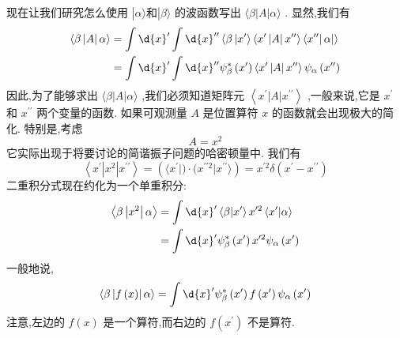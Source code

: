 \documentclass[lang=cn,newtx,10pt,scheme=chinese,thmcnt=section]{elegantbook}
\begin{document}
现在让我们研究怎么使用 $| {\alpha \rangle \text{和}}| \beta \rangle$ 的波函数写出 $\langle \beta \left| A\right| \alpha \rangle$ . 显然,我们有
\begin{equation}
	\begin{aligned}
		\langle \beta \left| A\right| \alpha \rangle &= \int \d{x}^{\prime }\int \d{x}^{\prime \prime }\left\langle {\beta \left| {{x}^{\prime }\rangle \left\langle {{x}^{\prime }\left| A\right| {x}^{\prime \prime }}\right\rangle \left\langle {x}^{\prime \prime }\right| \alpha }\right| }\right\rangle\\
		&= \int \d{x}^{\prime }\int \d{x}^{\prime \prime }{\psi }_{\beta }^{ * }\left( {x}^{\prime }\right) \left\langle {{x}^{\prime }\left| A\right| {x}^{\prime \prime }}\right\rangle {\psi }_{\alpha }\left( {x}^{\prime \prime }\right)
	\end{aligned}
\end{equation}
因此,为了能够求出 $\langle \beta \left| A\right| \alpha \rangle$ ,我们必须知道矩阵元 $\left\langle {{x}^{\prime }\left| A\right| {x}^{\prime \prime }}\right\rangle$ ,一般来说,它是 ${x}^{\prime }$ 和 ${x}^{\prime \prime }$ 两个变量的函数.
如果可观测量 $A$ 是位置算符 $x$ 的函数就会出现极大的简化. 特别是,考虑
\begin{equation}
	A = {x}^{2}
\end{equation}
它实际出现于将要讨论的简谐振子问题的哈密顿量中. 我们有
\begin{equation}
	\left\langle {{x}^{\prime }\left| {x}^{2}\right| {x}^{\prime \prime }}\right\rangle = ( {\langle {{x}^{\prime } | }) \cdot ( {{x}^{\prime \prime 2} | {x}^{\prime \prime }}\rangle }) = {x}^{\prime 2}\delta ( {x}^{\prime } - {x}^{\prime \prime })
\end{equation}
二重积分式现在约化为一个单重积分:
\begin{equation}
	\begin{aligned}
		\left\langle {\beta \left| {x}^{2}\right| \alpha }\right\rangle &= \int \d{x}^{\prime }\left\langle {\beta | {x}^{\prime }}\right\rangle {x}^{\prime 2}\left\langle {{x}^{\prime } | \alpha }\right\rangle\\
		&= \int \d{x}^{\prime }{\psi }_{\beta }^{ * }\left( {x}^{\prime }\right) {x}^{\prime 2}{\psi }_{\alpha }\left( {x}^{\prime }\right)
	\end{aligned}
\end{equation}
一般地说,
\begin{equation}
	\langle \beta \left| {f\left( x\right) }\right| \alpha \rangle = \int \d{x}^{\prime }{\psi }_{\beta }^{ * }\left( {x}^{\prime }\right) f\left( {x}^{\prime }\right) {\psi }_{\alpha }\left( {x}^{\prime }\right)
\end{equation}
注意,左边的 $f\left( x\right)$ 是一个算符,而右边的 $f\left( {x}^{\prime }\right)$ 不是算符.
\end{document}
